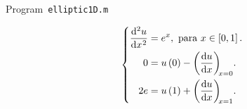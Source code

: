 \begin{listing}[ht!]
    \tiny
    \centering
    \caption{Program~\texttt{elliptic1D.m}}
    \label{code:elliptic1D.m}
\end{listing}

\begin{equation}\label{eq:poisson1drobindconditions}
    \left\{
    \begin{aligned}
        \diff[2]{u}{x}
         & =e^{x},
        \text{ para }x\in\left[0,1\right].     \\
        0
         & = u\left(0\right)-\diff{u}{x}[x=0]. \\
        2e
         & =u\left(1\right)+\diff{u}{x}[x=1].
    \end{aligned}
    \right.
\end{equation}

